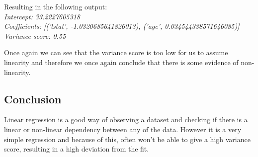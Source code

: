 Resulting in the following output:\\
\textit{Intercept: 33.2227605318\\
	Coefficients: [('lstat', -1.0320685641826013), ('age', 0.034544338571646085)]\\
	Variance score: 0.55\\}

Once again we can see that the variance score is too low for us to assume linearity and therefore we once again conclude that there is some evidence of non-linearity.

\subsection{Conclusion}
Linear regression is a good way of observing a dataset and checking if there is a linear or non-linear dependency between any of the data. However it is a very simple regression and because of this, often won't be able to give a high variance score, resulting in a high deviation from the fit.